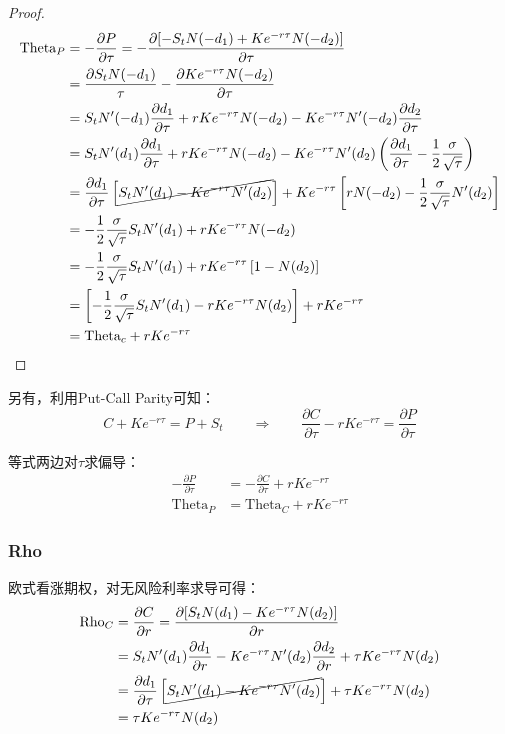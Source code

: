 \documentclass[11pt]{article}
\begin{document}
\begin{proof}
\begin{align*}
    \text{Theta}_P &= -\frac{\partial P}{\partial \tau} = - \frac{\partial [-S_t N(-d_1) + Ke^{-r\tau} N(-d_2)]}{\partial \tau} \\ 
    &= \frac{\partial S_t N(-d_1)}{\tau} - \frac{\partial Ke^{-r\tau} N(-d_2)}{\partial \tau} \\ 
    &= S_t N'(-d_1)\frac{\partial d_1}{\partial \tau} + rKe^{-r\tau}N(-d_2) - Ke^{-r\tau} N'(-d_2)\frac{\partial d_2}{\partial \tau} \\
    &= S_t N'(d_1)\frac{\partial d_1}{\partial \tau} + r Ke^{-r\tau} N(-d_2) - Ke^{-r\tau}N'(d_2)\left(\frac{\partial d_1}{\partial \tau} -\frac{1}{2}\frac{\sigma}{\sqrt{\tau}} \right) \\
    &= \frac{\partial d_1}{\partial \tau} \left[\cancel{S_t N'(d_1) - Ke^{-r\tau} N'(d_2) } \right] + Ke^{-r\tau} \left[ rN(-d_2) -\frac{1}{2}\frac{\sigma}{\sqrt{\tau}} N'(d_2)\right] \\
    &=  -\frac{1}{2}\frac{\sigma}{\sqrt{\tau}}S_t N'(d_1) + rKe^{-r\tau} N(-d_2) \\
    &=  -\frac{1}{2}\frac{\sigma}{\sqrt{\tau}}S_t N'(d_1) + rKe^{-r\tau} \left[ 1- N(d_2) \right] \\
    &= \left[ -\frac{1}{2}\frac{\sigma}{\sqrt{\tau}}S_t N'(d_1) - rKe^{-r\tau}N(d_2) \right] + rKe^{-r\tau} \\
    & = \text{Theta}_c + rKe^{-r\tau}
\end{align*}
\end{proof}

另有，利用Put-Call Parity可知：
\begin{equation*}
    C + Ke^{-r\tau} = P + S_t \qquad \Rightarrow \qquad \frac{\partial C}{\partial \tau} - rKe^{-r\tau} = \frac{\partial P}{\partial \tau} 
\end{equation*}

等式两边对$\tau$求偏导：
\begin{align*}
    -\frac{\partial P}{\partial \tau} & = -\frac{\partial C}{\partial \tau} + rKe^{-r\tau} \\
    \text{Theta}_P &= \text{Theta}_C + rKe^{-r\tau}
\end{align*}

\subsubsection{Rho}

欧式看涨期权，对无风险利率求导可得：
\begin{align*}
    \text{Rho}_C &= \frac{\partial C}{\partial r} = 
    \frac{\partial [S_t N(d_1) - Ke^{-r\tau} N(d_2)]}{\partial r} \\
    &= S_t N'(d_1) \frac{\partial d_1}{\partial r} - Ke^{-r\tau} N'(d_2)\frac{\partial d_2}{\partial r} + \tau K e^{-r\tau} N(d_2) \\
    &= \frac{\partial d_1}{\partial \tau} \left[\cancel{S_t N'(d_1) - Ke^{-r\tau} N'(d_2) } \right] + \tau K e^{-r\tau} N(d_2) \\
    &= \tau K e^{-r\tau} N(d_2)
\end{align*}
\end{document}
